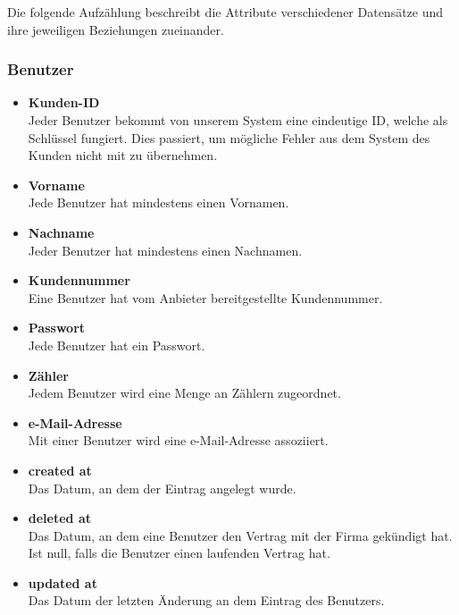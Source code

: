 Die folgende Aufzählung beschreibt die Attribute verschiedener Datensätze und ihre jeweiligen Beziehungen zueinander.

\subsubsection*{Benutzer}
	\begin{itemize}
	    \item \textbf{Kunden-ID}\hfill\\
	    Jeder Benutzer bekommt von unserem System eine eindeutige ID, welche als Schlüssel fungiert. Dies passiert, um mögliche Fehler aus dem System des Kunden nicht mit zu übernehmen.
  		\item \textbf{Vorname}\hfill \\
  		Jede Benutzer hat mindestens einen Vornamen.
 		\item \textbf{Nachname}\hfill \\
 		Jeder Benutzer hat mindestens einen Nachnamen.
 		\item \textbf{Kundennummer}\hfill \\
 		Eine Benutzer hat vom Anbieter bereitgestellte Kundennummer.
 		\item \textbf{Passwort} \hfill \\
 		Jede Benutzer hat ein Passwort.
		\item \textbf{Zähler}\hfill \\
		Jedem Benutzer wird eine Menge an Zählern zugeordnet.
		\item \textbf{e-Mail-Adresse}\hfill \\
		Mit einer Benutzer wird eine e-Mail-Adresse assoziiert.
		\item \textbf{created at}\hfill \\
		Das Datum, an dem der Eintrag angelegt wurde.
		\item \textbf{deleted at}\hfill \\
		Das Datum, an dem eine Benutzer den Vertrag mit der Firma gekündigt hat. Ist null, falls die Benutzer einen laufenden Vertrag hat.
		\item \textbf{updated at}\hfill \\
		Das Datum der letzten Änderung an dem Eintrag des Benutzers.
	\end{itemize}
